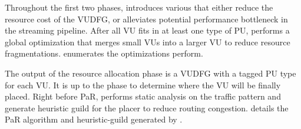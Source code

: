 Throughout the first two phases, \name introduces various  that either reduce the
resource cost of the VUDFG, or alleviates potential performance bottleneck in the streaming
pipeline.
After all VU fits in at least one type of PU, \name performs a global optimization that merges small VUs into a larger VU to reduce resource fragmentations.
 enumerates the optimizations \name perform.

The output of the resource allocation phase is a VUDFG with a tagged PU type for each VU.
It is up to the
 phase to determine where the VU will be finally placed.
Right before PaR, \name performs static analysis on the traffic pattern and generate heuristic guild
for the placer to reduce routing congestion.
 details the PaR algorithm and heuristic-guild generated by \name.

